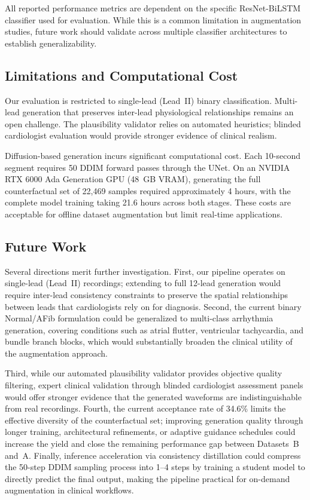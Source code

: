 \documentclass[conference]{IEEEtran}
\begin{document}
All reported performance metrics are dependent on the specific ResNet-BiLSTM classifier used for evaluation. While this is a common limitation in augmentation studies, future work should validate across multiple classifier architectures to establish generalizability.

\subsection{Limitations and Computational Cost}
\label{sec:limitations}

Our evaluation is restricted to single-lead (Lead~II) binary classification. Multi-lead generation that preserves inter-lead physiological relationships remains an open challenge. The plausibility validator relies on automated heuristics; blinded cardiologist evaluation would provide stronger evidence of clinical realism.

Diffusion-based generation incurs significant computational cost. Each 10-second segment requires 50 DDIM forward passes through the UNet. On an NVIDIA RTX 6000 Ada Generation GPU (48~GB VRAM), generating the full counterfactual set of 22,469 samples required approximately 4 hours, with the complete model training taking 21.6 hours across both stages. These costs are acceptable for offline dataset augmentation but limit real-time applications.

\subsection{Future Work}

Several directions merit further investigation. First, our pipeline operates on single-lead (Lead~II) recordings; extending to full 12-lead generation would require inter-lead consistency constraints to preserve the spatial relationships between leads that cardiologists rely on for diagnosis. Second, the current binary Normal/AFib formulation could be generalized to multi-class arrhythmia generation, covering conditions such as atrial flutter, ventricular tachycardia, and bundle branch blocks, which would substantially broaden the clinical utility of the augmentation approach.

Third, while our automated plausibility validator provides objective quality filtering, expert clinical validation through blinded cardiologist assessment panels would offer stronger evidence that the generated waveforms are indistinguishable from real recordings. Fourth, the current acceptance rate of 34.6\% limits the effective diversity of the counterfactual set; improving generation quality through longer training, architectural refinements, or adaptive guidance schedules could increase the yield and close the remaining performance gap between Datasets~B and~A. Finally, inference acceleration via consistency distillation \cite{song2023consistency} could compress the 50-step DDIM sampling process into 1--4 steps by training a student model to directly predict the final output, making the pipeline practical for on-demand augmentation in clinical workflows.
\end{document}
